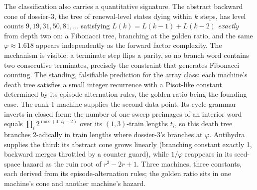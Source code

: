 \documentclass[11pt]{article}
\begin{document}
The classification also carries a quantitative signature. The
abstract backward cone of dossier-3, the tree of renewal-level
states dying within $k$ steps, has level counts
$9, 19, 31, 50, 81, \ldots$ satisfying $L(k) = L(k{-}1) + L(k{-}2)$
\emph{exactly} from depth two on: a Fibonacci tree, branching at the
golden ratio, and the same $\varphi \approx 1.618$ appears
independently as the forward factor complexity. The mechanism is
visible: a terminate step flips a parity, so no branch word contains
two consecutive terminates, precisely the constraint that
generates Fibonacci counting. The standing, falsifiable prediction
for the array class: each machine's death tree satisfies a small
integer recurrence with a Pisot-like constant determined by its
episode-alternation rules, the golden ratio being the founding case.
The rank-1 machine supplies the second data point. Its cycle
grammar inverts in closed form: the number of one-sweep preimages
of an interior word equals $\prod_i 2^{\max(0,\,t_i-2)}$ over its
$(1,3)$-train lengths $t_i$, so this death tree branches 2-adically
in train lengths where dossier-3's branches at $\varphi$. Antihydra
supplies the third: its abstract cone grows linearly (branching
constant exactly 1, backward merges throttled by a counter guard),
while $1/\varphi$ reappears in its seed-space hazard as the ruin
root of $r^{3} - 2r + 1$. Three machines, three constants, each
derived from its episode-alternation rules; the golden ratio sits in
one machine's cone and another machine's hazard.
\end{document}
